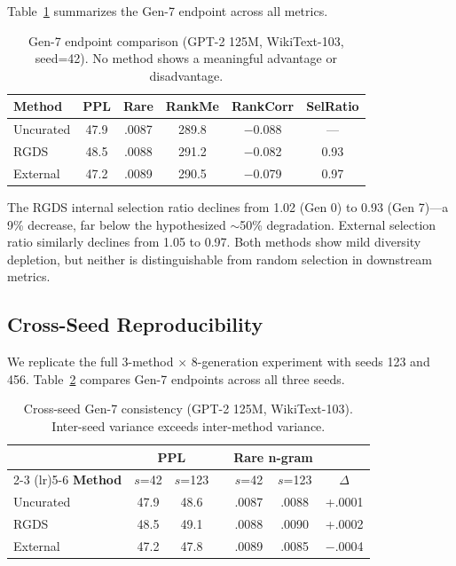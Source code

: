\documentclass[11pt]{article}
\begin{document}
Table~\ref{tab:gen7_summary} summarizes the Gen-7 endpoint across all metrics.

\begin{table}[h]
\centering
\caption{Gen-7 endpoint comparison (GPT-2 125M, WikiText-103, seed=42). No method shows a meaningful advantage or disadvantage.}
\label{tab:gen7_summary}
\small
\begin{tabular}{l ccccc}
\toprule
\textbf{Method} & \textbf{PPL} & \textbf{Rare} & \textbf{RankMe} & \textbf{RankCorr} & \textbf{SelRatio} \\
\midrule
Uncurated    & 47.9 & .0087 & 289.8 & $-$0.088 & --- \\
RGDS         & 48.5 & .0088 & 291.2 & $-$0.082 & 0.93 \\
External     & 47.2 & .0089 & 290.5 & $-$0.079 & 0.97 \\
\bottomrule
\end{tabular}
\end{table}

The RGDS internal selection ratio declines from 1.02 (Gen 0) to 0.93 (Gen 7)---a 9\% decrease, far below the hypothesized $\sim$50\% degradation. External selection ratio similarly declines from 1.05 to 0.97. Both methods show mild diversity depletion, but neither is distinguishable from random selection in downstream metrics.

\subsection{Cross-Seed Reproducibility}
\label{sec:seeds}

We replicate the full 3-method $\times$ 8-generation experiment with seeds 123 and 456. Table~\ref{tab:cross_seed} compares Gen-7 endpoints across all three seeds.

\begin{table}[h]
\centering
\caption{Cross-seed Gen-7 consistency (GPT-2 125M, WikiText-103). Inter-seed variance exceeds inter-method variance.}
\label{tab:cross_seed}
\small
\begin{tabular}{l cc c cc c}
\toprule
& \multicolumn{2}{c}{\textbf{PPL}} && \multicolumn{2}{c}{\textbf{Rare n-gram}} \\
\cmidrule(lr){2-3} \cmidrule(lr){5-6}
\textbf{Method} & $s$=42 & $s$=123 && $s$=42 & $s$=123 & $\Delta$ \\
\midrule
Uncurated & 47.9 & 48.6 && .0087 & .0088 & +.0001 \\
RGDS      & 48.5 & 49.1 && .0088 & .0090 & +.0002 \\
External  & 47.2 & 47.8 && .0089 & .0085 & $-$.0004 \\
\bottomrule
\end{tabular}
\end{table}
\end{document}
